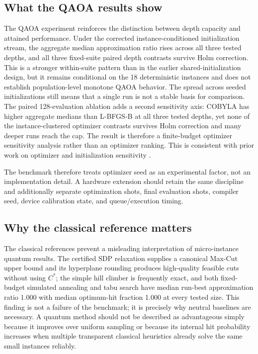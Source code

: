 \documentclass[5p,times]{elsarticle}
\begin{document}
\subsection{What the QAOA results show}
The QAOA experiment reinforces the distinction between depth capacity and attained performance. Under the corrected instance-conditioned initialization stream, the aggregate median approximation ratio rises across all three tested depths, and all three fixed-suite paired depth contrasts survive Holm correction. This is a stronger within-suite pattern than in the earlier shared-initialization design, but it remains conditional on the 18 deterministic instances and does not establish population-level monotone QAOA behavior. The spread across seeded initializations still means that a single run is not a stable basis for comparison. The paired 128-evaluation ablation adds a second sensitivity axis: COBYLA has higher aggregate medians than L-BFGS-B at all three tested depths, yet none of the instance-clustered optimizer contrasts survives Holm correction and many deeper runs reach the cap. The result is therefore a finite-budget optimizer sensitivity analysis rather than an optimizer ranking. This is consistent with prior work on optimizer and initialization sensitivity \cite{fernandez2022,sack2021}.

The benchmark therefore treats optimizer seed as an experimental factor, not an implementation detail. A hardware extension should retain the same discipline and additionally separate optimization shots, final evaluation shots, compiler seed, device calibration state, and queue/execution timing.

\subsection{Why the classical reference matters}
The classical references prevent a misleading interpretation of micro-instance quantum results. The certified SDP relaxation supplies a canonical Max-Cut upper bound and its hyperplane rounding produces high-quality feasible cuts without using $C^*$; the simple hill climber is frequently exact, and both fixed-budget simulated annealing and tabu search have median run-best approximation ratio 1.000 with median optimum-hit fraction 1.000 at every tested size. This finding is not a failure of the benchmark; it is precisely why neutral baselines are necessary. A quantum method should not be described as advantageous simply because it improves over uniform sampling or because its internal hit probability increases when multiple transparent classical heuristics already solve the same small instances reliably.
\end{document}
